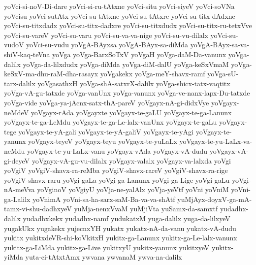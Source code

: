 {yoVci-si-noV-Di-dare
yoVci-si-ru-tAtxne
yoVci-situ
yoVci-siyeV
yoVci-soVNa
yoVcisu
yoVci-sutAtx
yoVci-su-tAtxne
yoVci-su-tAtxre
yoVci-su-titx-dAdxne
yoVci-su-titxdadx
yoVci-su-titx-dadxre
yoVci-su-titxdudx
yoVci-su-titx-ru-tetxVve
yoVci-su-vareV
yoVci-su-varu
yoVci-su-va-va-nige
yoVci-su-vu-dilalx
yoVci-su-vudoV
yoVci-su-vudu
yoVgA-BAyxsa
yoVgA-BAyx-sa-diMda
yoVgA-BAyx-sa-va-shiV-kaq-teVna
yoVga
yoVga-BarxSoTxV
yoVgaH
yoVga-daM-Da-vanunx
yoVga-dalilx
yoVga-da-lilxdudx
yoVga-diMda
yoVga-diM-dalU
yoVga-keSxVmaM
yoVga-keSxV-ma-dhu-raM-dha-rasayx
yoVgakekx
yoVga-meY-shavx-ramf
yoVga-sU-tarx-dalilx
yoVgasathxH
yoVga-shA-satxrX-dalilx
yoVga-shicx-tatx-vaqtitx
yoVga-vA-gu-tatxde
yoVga-vanUnx
yoVga-vanunx
yoVga-ve-nanx-lapx-Du-tatxde
yoVga-vide
yoVga-ya-jAcnx-satx-thA-pareV
yoVgayx-nA-gi-didxVye
yoVgayx-neMdeV
yoVgayx-rAda
yoVgayxte
yoVgayx-te-gaLU
yoVgayx-te-ga-Lanunx
yoVgayx-te-ga-LeMdu
yoVgayx-te-ga-Le-lalx-vanUnx
yoVgayx-te-gaLu
yoVgayx-tege
yoVgayx-te-yA-gali
yoVgayx-te-yA-galiV
yoVgayx-te-yAgi
yoVgayx-te-yanunx
yoVgayx-teyeV
yoVgayx-teyu
yoVgayx-te-yuLaLx
yoVgayx-te-yu-LaLx-va-neMdu
yoVgayx-te-yu-LaLx-vanu
yoVgayx-vAda
yoVgayx-vA-dudu
yoVgayx-vA-gi-deyeV
yoVgayx-vA-gu-vu-dilalx
yoVgayx-valalx
yoVgayx-va-lalxda
yoVgi
yoVgiV
yoVgiV-shavx-ra-reMba
yoVgiV-shavx-rareV
yoVgiV-shavx-ra-rige
yoVgiV-shavx-raru
yoVgi-gaLa
yoVgi-ga-Lanunx
yoVgi-ga-Lige
yoVgi-gaLu
yoVgi-nA-meVva
yoVginoV
yoVgiyU
yoVja-ne-yalAlx
yoVja-yeVtf
yoVni
yoVniM
yoVni-ga-Lalilx
yoVnimA
yoVni-sa-ha-sarx-saM-Ba-va-va-shAtf
yuMjAyx-doyxV-ga-mA-tamx-vi-shu-dadhxyeV
yuMja-nenxVvaM
yuMjiVta
yuSamx-da-samxtf
yudadhx-dalilx
yudadhxkekx
yudadhx-namf
yudukatxM
yuga-dalilx
yuga-da-lilxyeV
yugakUkx
yugakekx
yujecnxYH
yukatx
yukatx-nA-da-vanu
yukatx-vA-dudu
yukitx
yukitxdeVR-shi-koVkitxH
yukitx-ga-Lanunx
yukitx-ga-Le-lalx-vanunx
yukitx-ga-LiMda
yukitx-ga-Live
yukitxyU
yukitx-yanunx
yukitxyeV
yukitx-yiMda
yuta-ci-tAtxtAmx
ywvana
ywvanaM
ywva-na-dalilx
‌
}
